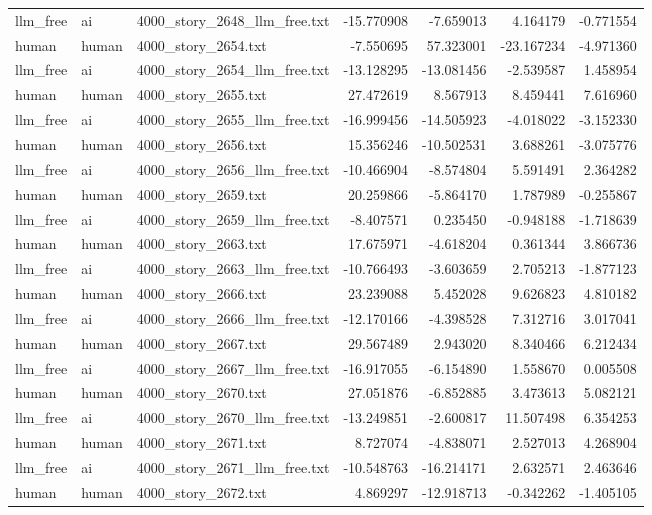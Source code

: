 \begin{longtable}{lllrrrr}
llm\_free & ai & 4000\_story\_2648\_llm\_free.txt & -15.770908 & -7.659013 & 4.164179 & -0.771554 \\
human & human & 4000\_story\_2654.txt & -7.550695 & 57.323001 & -23.167234 & -4.971360 \\
llm\_free & ai & 4000\_story\_2654\_llm\_free.txt & -13.128295 & -13.081456 & -2.539587 & 1.458954 \\
human & human & 4000\_story\_2655.txt & 27.472619 & 8.567913 & 8.459441 & 7.616960 \\
llm\_free & ai & 4000\_story\_2655\_llm\_free.txt & -16.999456 & -14.505923 & -4.018022 & -3.152330 \\
human & human & 4000\_story\_2656.txt & 15.356246 & -10.502531 & 3.688261 & -3.075776 \\
llm\_free & ai & 4000\_story\_2656\_llm\_free.txt & -10.466904 & -8.574804 & 5.591491 & 2.364282 \\
human & human & 4000\_story\_2659.txt & 20.259866 & -5.864170 & 1.787989 & -0.255867 \\
llm\_free & ai & 4000\_story\_2659\_llm\_free.txt & -8.407571 & 0.235450 & -0.948188 & -1.718639 \\
human & human & 4000\_story\_2663.txt & 17.675971 & -4.618204 & 0.361344 & 3.866736 \\
llm\_free & ai & 4000\_story\_2663\_llm\_free.txt & -10.766493 & -3.603659 & 2.705213 & -1.877123 \\
human & human & 4000\_story\_2666.txt & 23.239088 & 5.452028 & 9.626823 & 4.810182 \\
llm\_free & ai & 4000\_story\_2666\_llm\_free.txt & -12.170166 & -4.398528 & 7.312716 & 3.017041 \\
human & human & 4000\_story\_2667.txt & 29.567489 & 2.943020 & 8.340466 & 6.212434 \\
llm\_free & ai & 4000\_story\_2667\_llm\_free.txt & -16.917055 & -6.154890 & 1.558670 & 0.005508 \\
human & human & 4000\_story\_2670.txt & 27.051876 & -6.852885 & 3.473613 & 5.082121 \\
llm\_free & ai & 4000\_story\_2670\_llm\_free.txt & -13.249851 & -2.600817 & 11.507498 & 6.354253 \\
human & human & 4000\_story\_2671.txt & 8.727074 & -4.838071 & 2.527013 & 4.268904 \\
llm\_free & ai & 4000\_story\_2671\_llm\_free.txt & -10.548763 & -16.214171 & 2.632571 & 2.463646 \\
human & human & 4000\_story\_2672.txt & 4.869297 & -12.918713 & -0.342262 & -1.405105 \\

\end{longtable}
